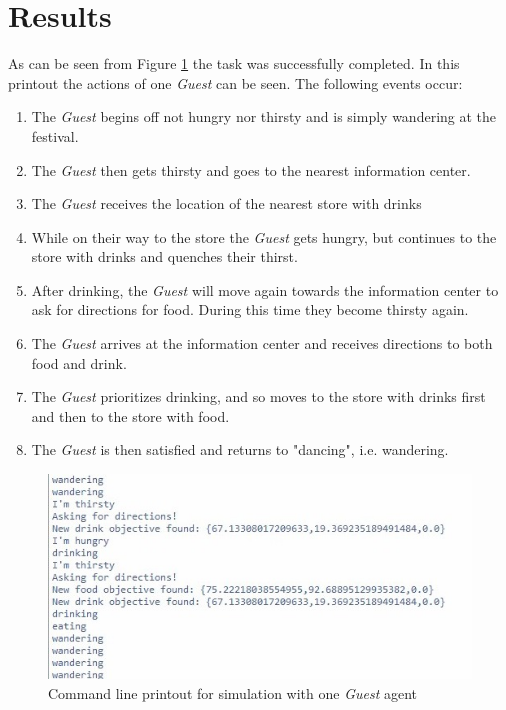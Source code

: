 \documentclass[a4paper]{article}
\begin{document}
\section{Results}
As can be seen from Figure \ref{fig:printout} the task was successfully completed. In this printout the actions of one \textit{Guest} can be seen. The following events occur:
\begin{enumerate}
    \item The \textit{Guest} begins off not hungry nor thirsty and is simply wandering at the festival.
    \item The \textit{Guest} then gets thirsty and goes to the nearest information center.
    \item The \textit{Guest} receives the location of the nearest store with drinks
    \item While on their way to the store the \textit{Guest} gets hungry, but continues to the store with drinks and quenches their thirst.
    \item After drinking, the \textit{Guest} will move again towards the information center to ask for directions for food. During this time they become thirsty again.
    \item The \textit{Guest} arrives at the information center and receives directions to both food and drink.
    \item The \textit{Guest} prioritizes drinking, and so moves to the store with drinks first and then to the store with food.
    \item The \textit{Guest} is then satisfied and returns to "dancing", i.e. wandering.
\end{enumerate}

\begin{figure}[H]
    \centering
    \includegraphics[scale=0.5]{printout.jpeg}
    \caption{Command line printout for simulation with one \textit{Guest} agent}
    \label{fig:printout}
\end{figure}
\end{document}

